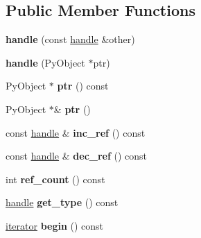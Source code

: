 \subsection*{Public Member Functions}
\begin{DoxyCompactItemize}
\item 
{\bfseries handle} (const \hyperlink{classhandle}{handle} \&other)\hypertarget{classhandle_a45201866d5f9c0b390688e3f0febb8fe}{}\label{classhandle_a45201866d5f9c0b390688e3f0febb8fe}

\item 
{\bfseries handle} (Py\+Object $\ast$ptr)\hypertarget{classhandle_a99eb912e1b9b823bc447980a16772584}{}\label{classhandle_a99eb912e1b9b823bc447980a16772584}

\item 
Py\+Object $\ast$ {\bfseries ptr} () const \hypertarget{classhandle_a0cd611a5486b72d1442d06fb81502c2a}{}\label{classhandle_a0cd611a5486b72d1442d06fb81502c2a}

\item 
Py\+Object $\ast$\& {\bfseries ptr} ()\hypertarget{classhandle_aba369bca41a28327a0812fddce26e95a}{}\label{classhandle_aba369bca41a28327a0812fddce26e95a}

\item 
const \hyperlink{classhandle}{handle} \& {\bfseries inc\+\_\+ref} () const \hypertarget{classhandle_a0af3b413256d528f596f3b7bf75e67b1}{}\label{classhandle_a0af3b413256d528f596f3b7bf75e67b1}

\item 
const \hyperlink{classhandle}{handle} \& {\bfseries dec\+\_\+ref} () const \hypertarget{classhandle_a96e1191579c94535750f65fd4d319320}{}\label{classhandle_a96e1191579c94535750f65fd4d319320}

\item 
int {\bfseries ref\+\_\+count} () const \hypertarget{classhandle_a72dc83742c431c7749c39494c0519776}{}\label{classhandle_a72dc83742c431c7749c39494c0519776}

\item 
\hyperlink{classhandle}{handle} {\bfseries get\+\_\+type} () const \hypertarget{classhandle_a1a632f1dc50700c39c47114bace931bb}{}\label{classhandle_a1a632f1dc50700c39c47114bace931bb}

\item 
\hyperlink{classiterator}{iterator} {\bfseries begin} () const \hypertarget{classhandle_af46264a5321add6cb496e54296378c91}{}\label{classhandle_af46264a5321add6cb496e54296378c91}


\end{DoxyCompactItemize}
